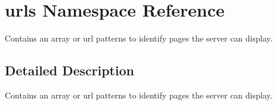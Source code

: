 \hypertarget{namespaceurls}{\section{urls Namespace Reference}
\label{namespaceurls}
}


Contains an array or url patterns to identify pages the server can display.  




\subsection{Detailed Description}
Contains an array or url patterns to identify pages the server can display. 